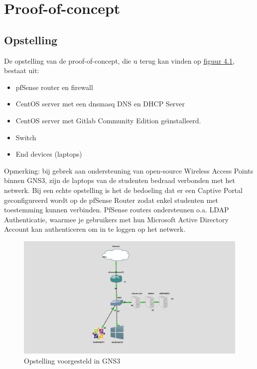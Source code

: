 \chapter{Proof-of-concept}
\label{ch:proofofconcept}



\section{Opstelling}

De opstelling van de  proof-of-concept, die u terug kan vinden op \hyperref[fig:Poc1]{figuur 4.1}, bestaat uit:
\begin{itemize}
	\item pfSense router en firewall
	\item CentOS server met een dnsmasq DNS en DHCP Server
	\item CentOS server met Gitlab Community Edition ge\"{\i}nstalleerd.
	\item Switch
	\item End devices (laptops)
\end{itemize}

Opmerking: bij gebrek aan ondersteuning van open-source Wireless Access Points binnen GNS3, zijn de laptops van de studenten bedraad verbonden met het netwerk. Bij een echte opstelling is het de bedoeling dat er een Captive Portal geconfigureerd wordt op de pfSense Router zodat enkel studenten met toestemming kunnen verbinden. PfSense routers ondersteunen o.a. LDAP Authenticatie, waarmee je gebruikers met hun Microsoft Active Directory Account kan authenticeren om in te loggen op het netwerk.   
	
\begin{figure}
	\includegraphics[width=\linewidth]{img/gns3FinalPoC.jpg}
	\caption{Opstelling voorgesteld in GNS3}
	\label{fig:PoC1}
\end{figure}


